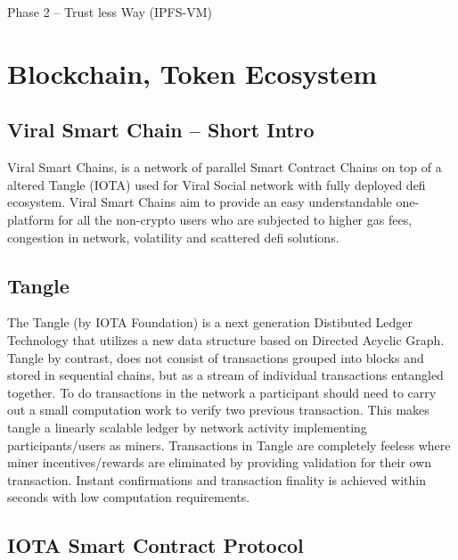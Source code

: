 \documentclass[10pt]{article}
\begin{document}
Phase 2 – Trust less Way (IPFS-VM)\\

\section{Blockchain, Token Ecosystem}

\subsection{Viral Smart Chain – Short Intro}

Viral Smart Chains, is a network of parallel Smart Contract Chains on top of a altered Tangle (IOTA) used for Viral Social network with fully deployed defi ecosystem. Viral Smart Chains aim to provide an easy understandable one-platform for all the non-crypto users who are subjected to higher gas fees, congestion in network, volatility and scattered defi solutions. \\

\subsection{Tangle}

The Tangle (by IOTA Foundation) is a next generation Distibuted Ledger Technology that utilizes a new data structure based on Directed Acyclic Graph. Tangle by contrast, does not consist of transactions grouped into blocks and stored in sequential chains, but as a stream of individual transactions entangled together. To do transactions in the network a participant should need to carry out a small computation work to verify two previous transaction. This makes tangle a linearly scalable ledger by network activity implementing participants/users as miners. Transactions in Tangle are completely feeless where miner incentives/rewards are eliminated by providing validation for their own transaction. Instant confirmations and transaction finality is achieved within seconds with low computation requirements.

\subsection{IOTA Smart Contract Protocol}
\end{document}

